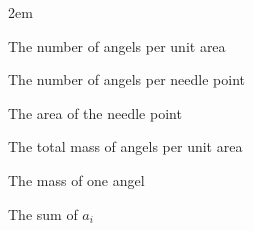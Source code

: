 
\begin{notation}

  \begin{notationlist}{2em}
    \item[$\displaystyle a$] The number of angels per unit area
    \item[$\displaystyle N$] The number of angels per needle point
    \item[$\displaystyle A$] The area of the needle point
    \item[$\displaystyle \sigma$] The total mass of angels per unit area
    \item[$\displaystyle m$] The mass of one angel
    \item[$\displaystyle \sum_{i=1}^n a_i$] The sum of $a_i$
  \end{notationlist}

\end{notation}





